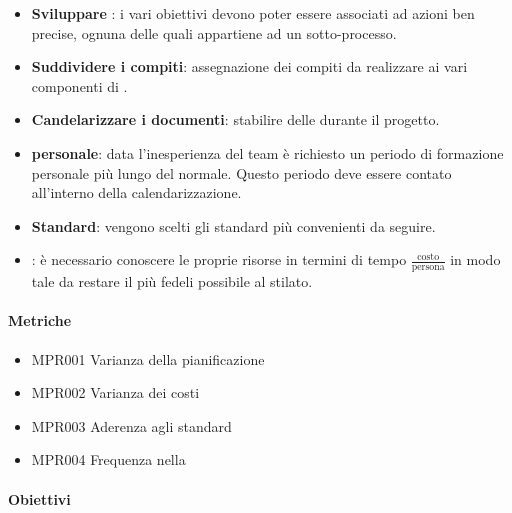 		\begin{itemize}
			\item \textbf{Sviluppare }: i vari obiettivi devono poter essere associati ad azioni ben precise, ognuna delle quali appartiene ad un sotto-processo.
			\item \textbf{Suddividere i compiti}: assegnazione dei compiti da realizzare ai vari componenti di \gruppo.
			\item \textbf{Candelarizzare i documenti}: stabilire delle  durante il progetto.
			\item \textbf{ personale}: data l'inesperienza del team è richiesto un periodo di formazione personale più lungo del normale. Questo periodo deve essere contato all'interno della calendarizzazione.
			\item \textbf{Standard}: vengono scelti gli standard più convenienti da seguire.
			\item \textbf{}: è necessario conoscere le proprie risorse in termini di tempo $\frac{\text{costo}}{\text{persona}}$ in modo tale da restare
				il più fedeli possibile al  stilato.
		\end{itemize}
	
		\paragraph*{Metriche}
		
		\begin{itemize}
			\item MPR001 Varianza della pianificazione
			\item MPR002 Varianza dei costi
			\item MPR003 Aderenza agli standard
			\item MPR004 Frequenza  nella 
		\end{itemize}
	
		\paragraph*{Obiettivi}
		
